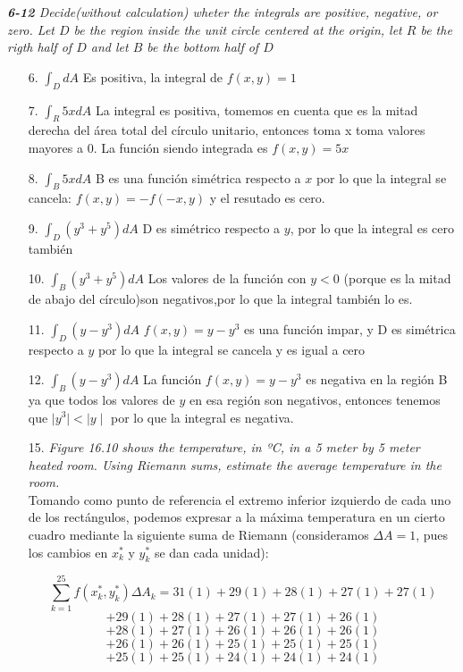 \documentclass[a4paper,12pt]{article}
\begin{document}
\textit{\textbf{6-12} Decide(without calculation) wheter the integrals are positive, negative, or zero. Let $D$ be the region inside the unit circle centered at the origin, let $R$ be the rigth half of $D$ and let $B$ be the bottom half of $D$}
\begin{itemize}
	\item[6.]$\int_{D}dA$
	         Es positiva, la integral de $f(x,y) = 1$
	\item[7.]$\int_{R}5xdA$
			  La integral es positiva, tomemos en cuenta que es la mitad derecha del área total del círculo unitario, entonces toma x toma valores mayores a $0$. La función siendo integrada es $f(x,y) = 5x$
	\item[8.]$\int_{B}5xdA$
			  B es una función simétrica respecto a $x$ por lo que la integral se cancela: $f(x,y) = -f (-x,y)$ y el resutado es cero.
	\item[9.]$\int_{D}(y^3 + y^5)dA$
		  	   D es simétrico respecto a $y$, por lo que la integral es cero también
	\item[10.]$\int_{B}(y^3+y^5)dA$
			   Los valores de la función con $y < 0$ (porque es la mitad de abajo del círculo)son negativos,por lo que la integral también lo es.
	\item[11.]$\int_{D}(y-y^3)dA$
				$f(x,y) = y- y^3$ es una función impar, y D es simétrica respecto a $y$ por lo que la integral se cancela y es igual a cero
	\item[12.]$\int_{B}(y-y^3)dA$
			 La función $f(x,y) = y -y^3$ es negativa en la región B ya que todos los valores de $y$ en esa región son negativos, entonces tenemos que $\mid y^3 \mid < \mid y \mid$ por lo que la integral es negativa.
	\item[15.] \textit{Figure 16.10 shows the temperature,
			   in ºC, in a 5 meter by 5 meter heated room. Using Riemann sums,
			   estimate the average temperature in the room.}\\

	Tomando como punto de referencia el extremo inferior izquierdo de cada uno
	de los rectángulos, podemos expresar a la máxima temperatura en un cierto
	cuadro mediante la siguiente suma de Riemann (consideramos $\Delta A = 1$,
	pues los cambios en $x^{*}_{k}$ y $y^{*}_{k}$ se dan cada unidad):

		$$ \sum_{k=1}^{25} f(x^{*}_{k}, y^{*}_{k}) \Delta A_{k} =
		   	 31(1) + 29(1) + 28(1) + 27(1) + 27(1)  $$
		$$ + 29(1) + 28(1) + 27(1) + 27(1) + 26(1) $$
		$$ + 28(1) + 27(1) + 26(1) + 26(1) + 26(1) $$
		$$ + 26(1) + 26(1) + 25(1) + 25(1) + 25(1) $$
		$$ + 25(1) + 25(1) + 24(1) + 24(1) + 24(1) $$


\end{itemize}
\end{document}
